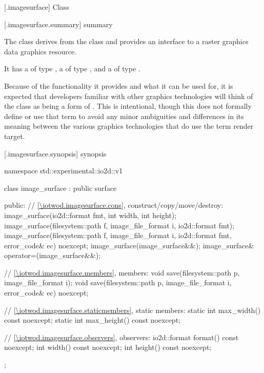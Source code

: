  [\iotwod.imagesurface] {Class }

 [\iotwod.imagesurface.summary] { summary}

\pnum
{}%
The class  derives from the  class and provides an interface to a raster graphics data graphics resource.

\pnum
It has a  of type , a  of type , and a  of type .

\pnum
\begin{note}
Because of the functionality it provides and what it can be used for, it is expected that developers familiar with other graphics technologies will think of the  class as being a form of . This is intentional, though this \documenttypename{} does not formally define or use that term to avoid any minor ambiguities and differences in its meaning between the various graphics technologies that do use the term render target.
\end{note}

 [\iotwod.imagesurface.synopsis] { synopsis}

\begin{codeblock}
namespace std::experimental::io2d::v1 {
  class image_surface : public surface {
  public:
    // \ref{\iotwod.imagesurface.cons}, construct/copy/move/destroy:
    image_surface(io2d::format fmt, int width, int height);
    image_surface(filesystem::path f, image_file_format i, 
      io2d::format fmt);
    image_surface(filesystem::path f, image_file_format i, 
      io2d::format fmt, error_code& ec) noexcept;
    image_surface(image_surface&&);
    image_surface& operator=(image_surface&&);
    
    // \ref{\iotwod.imagesurface.members}, members:
    void save(filesystem::path p, image_file_format i);
    void save(filesystem::path p, image_file_format i, error_code& ec) noexcept;
    
    // \ref{\iotwod.imagesurface.staticmembers}, static members:
    static int max_width() const noexcept;
    static int max_height() const noexcept;
    
    // \ref{\iotwod.imagesurface.observers}, observers:
    io2d::format format() const noexcept;
    int width() const noexcept;
    int height() const noexcept;
  };
}
\end{codeblock}

